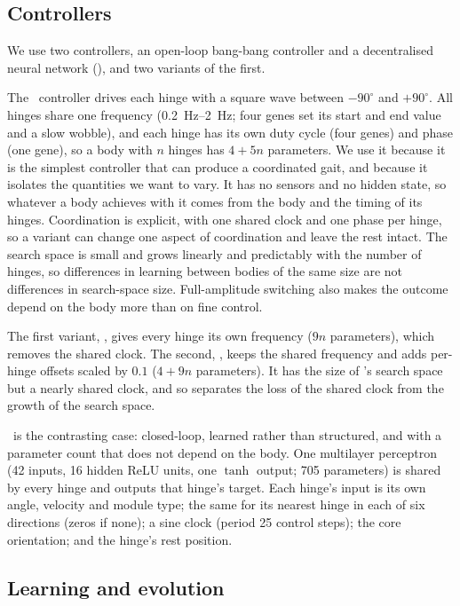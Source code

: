 \subsection{Controllers}
\label{sec:brains}

We use two controllers, an open-loop bang-bang controller and a decentralised neural network (\dann), and two variants of the first.

The \bb\ controller drives each hinge with a square wave between $-90^\circ$ and $+90^\circ$. All hinges share one frequency (\SIrange{0.2}{2}{Hz}; four genes set its start and end value and a slow wobble), and each hinge has its own duty cycle (four genes) and phase (one gene), so a body with $n$ hinges has $4 + 5n$ parameters. We use it because it is the simplest controller that can produce a coordinated gait, and because it isolates the quantities we want to vary. It has no sensors and no hidden state, so whatever a body achieves with it comes from the body and the timing of its hinges. Coordination is explicit, with one shared clock and one phase per hinge, so a variant can change one aspect of coordination and leave the rest intact. The search space is small and grows linearly and predictably with the number of hinges, so differences in learning between bodies of the same size are not differences in search-space size. Full-amplitude switching also makes the outcome depend on the body more than on fine control.

The first variant, \bbfree, gives every hinge its own frequency ($9n$ parameters), which removes the shared clock. The second, \bbdrift, keeps the shared frequency and adds per-hinge offsets scaled by $0.1$ ($4 + 9n$ parameters). It has the size of \bbfree's search space but a nearly shared clock, and so separates the loss of the shared clock from the growth of the search space.

\dann\ is the contrasting case: closed-loop, learned rather than structured, and with a parameter count that does not depend on the body. One multilayer perceptron (42 inputs, 16 hidden ReLU units, one $\tanh$ output; 705 parameters) is shared by every hinge and outputs that hinge's target. Each hinge's input is its own angle, velocity and module type; the same for its nearest hinge in each of six directions (zeros if none); a sine clock (period 25 control steps); the core orientation; and the hinge's rest position.

\subsection{Learning and evolution}
\label{sec:learning}

